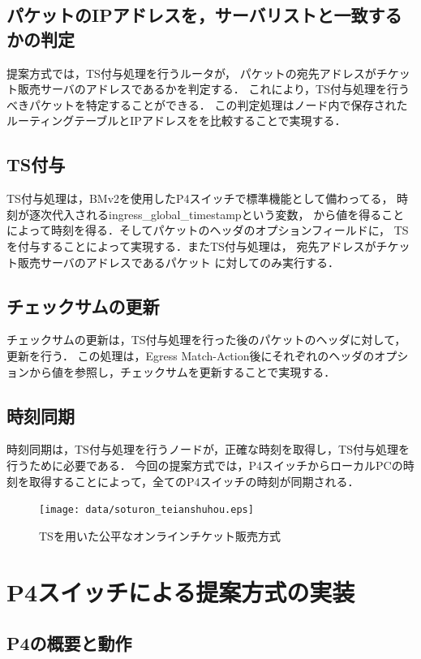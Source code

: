 \documentclass[a4j,11pt]{jreport}
\begin{document}
\section{パケットのIPアドレスを，サーバリストと一致するかの判定}
提案方式では，TS付与処理を行うルータが，
パケットの宛先アドレスがチケット販売サーバのアドレスであるかを判定する．
これにより，TS付与処理を行うべきパケットを特定することができる．
この判定処理はノード内で保存されたルーティングテーブルとIPアドレスをを比較することで実現する．

\section{TS付与}
TS付与処理は，BMv2を使用したP4スイッチで標準機能として備わってる，
時刻が逐次代入されるingress\_global\_timestampという変数，
から値を得ることによって時刻を得る．そしてパケットのヘッダのオプションフィールドに，
TSを付与することによって実現する．またTS付与処理は，
宛先アドレスがチケット販売サーバのアドレスであるパケット
に対してのみ実行する．

\section{チェックサムの更新}
チェックサムの更新は，TS付与処理を行った後のパケットのヘッダに対して，更新を行う．
この処理は，Egress Match-Action後にそれぞれのヘッダのオプションから値を参照し，チェックサムを更新することで実現する．


\section{時刻同期}
時刻同期は，TS付与処理を行うノードが，正確な時刻を取得し，TS付与処理を行うために必要である．
今回の提案方式では，P4スイッチからローカルPCの時刻を取得することによって，全てのP4スイッチの時刻が同期される．

\begin{figure}[htbp]
  \centering
  \texttt{[image: data/soturon\_teianshuhou.eps]}
  \vspace{0mm}
  \caption{TSを用いた公平なオンラインチケット販売方式}
  \label{fig:teianshuhou}
\end{figure}


\chapter{P4スイッチによる提案方式の実装}

\section{P4の概要と動作}
\end{document}

